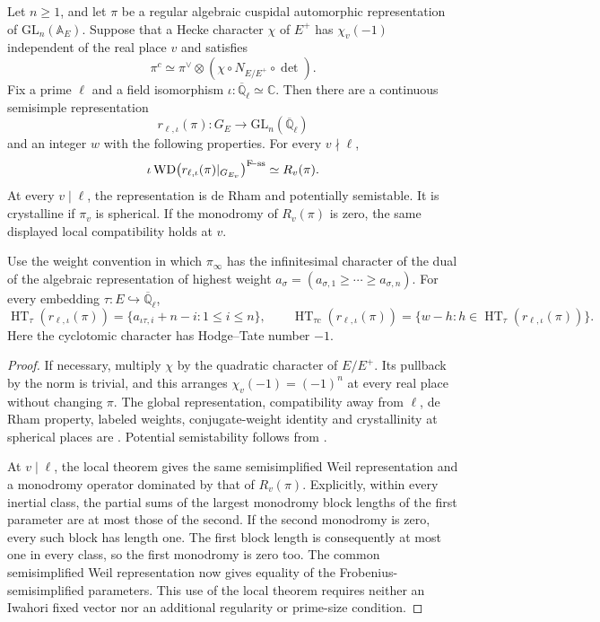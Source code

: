 \begin{theorem}\label{thm-classical-galois-zero-monodromy}
Let $n\geq1$, and let $\pi$ be a regular algebraic cuspidal
automorphic representation of $\mathrm{GL}_n(\mathbb A_E)$.
Suppose that a Hecke character $\chi$ of $E^+$ has $\chi_v(-1)$
independent of the real place $v$ and satisfies
\[
 \pi^c\simeq\pi^\vee\otimes
              (\chi\circ N_{E/E^+}\circ\det).
\]
Fix a prime $\ell$ and a field isomorphism
$\iota:\overline{\mathbb Q}_\ell\simeq\mathbb C$.
Then there are a continuous semisimple representation
\[
 r_{\ell,\iota}(\pi):G_E\longrightarrow
                   \mathrm{GL}_n(\overline{\mathbb Q}_\ell)
\]
and an integer $w$ with the following properties.
For every $v\nmid\ell$,
\[
 \iota\operatorname{WD}
      \bigl(r_{\ell,\iota}(\pi)|_{G_{E_v}}\bigr)^%
          {\mathrm{F\!\!-ss}}
       \simeq R_v(\pi).
\]
At every $v\mid\ell$, the representation is de Rham and
potentially semistable. It is crystalline if $\pi_v$ is spherical.
If the monodromy of $R_v(\pi)$ is zero, the same displayed
local compatibility holds at $v$.

Use the weight convention in which $\pi_\infty$ has the
infinitesimal character of the dual of the algebraic representation
of highest weight
$a_\sigma=(a_{\sigma,1}\geq\cdots\geq a_{\sigma,n})$.
For every embedding $\tau:E\hookrightarrow\overline{\mathbb Q}_\ell$,
\[
 \operatorname{HT}_\tau(r_{\ell,\iota}(\pi))
       =\{a_{\iota\tau,i}+n-i:1\leq i\leq n\},
 \qquad
 \operatorname{HT}_{\tau c}(r_{\ell,\iota}(\pi))
       =\{w-h:h\in\operatorname{HT}_\tau(r_{\ell,\iota}(\pi))\}.
\]
Here the cyclotomic character has Hodge--Tate number $-1$.
\end{theorem}

\begin{proof}
If necessary, multiply $\chi$ by the quadratic character of $E/E^+$.
Its pullback by the norm is trivial, and this arranges
$\chi_v(-1)=(-1)^n$ at every real place without changing $\pi$.
The global representation, compatibility away from $\ell$,
de Rham property, labeled weights, conjugate-weight identity and
crystallinity at spherical places are
\cite[Theorem~2.1.1]{blggt-potential-automorphy}.
Potential semistability follows from
\cite[Theorem~0.6, equivalently Theorem~5.19]{berger-monodromy}.

At $v\mid\ell$, the local theorem
\cite[Theorem~1.1]{blggt-local-global-p} gives the same
semisimplified Weil representation and a monodromy operator
dominated by that of $R_v(\pi)$. Explicitly, within every
inertial class, the partial sums of the largest monodromy block
lengths of the first parameter are at most those of the second.
If the second monodromy is zero, every such block has length one.
The first block length is consequently at most one in every
class, so the first monodromy is zero too. The common
semisimplified Weil representation now gives equality of the
Frobenius-semisimplified parameters. This use of the local theorem
requires neither an Iwahori fixed vector nor an additional
regularity or prime-size condition.
\end{proof}

